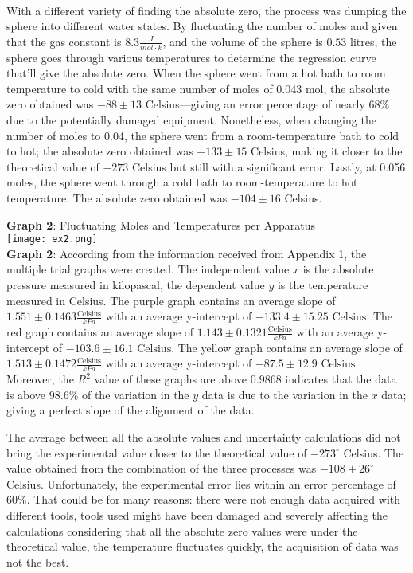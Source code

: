 \documentclass[11pt]{article}
\begin{document}
\\With a different variety of finding the absolute zero, the process was dumping the sphere into different water states. By fluctuating the number of moles and given that the gas constant is $8.3 \frac{J}{mol\cdot k}$, and the volume of the sphere is $0.53$ litres, the sphere goes through various temperatures to determine the regression curve that'll give the absolute zero. When the sphere went from a hot bath to room temperature to cold with the same number of moles of 0.043 mol, the absolute zero obtained was $-88\pm13$ Celsius—giving an error percentage of nearly $68\%$ due to the potentially damaged equipment. Nonetheless, when changing the number of moles to 0.04, the sphere went from a room-temperature bath to cold to hot; the absolute zero obtained was $-133\pm15$ Celsius, making it closer to the theoretical value of $-273$ Celsius but still with a significant error. Lastly, at 0.056 moles, the sphere went through a cold bath to room-temperature to hot temperature. The absolute zero obtained was $-104\pm 16$ Celsius. 
\newpage 
\begin{center}
    \textbf{Graph 2}: Fluctuating Moles and Temperatures per Apparatus\\
    \texttt{[image: ex2.png]}\\\textbf{Graph 2}: According from the information received from Appendix 1, the multiple trial graphs were created. The independent value $x$ is the absolute pressure measured in kilopascal, the dependent value $y$ is the temperature measured in Celsius. The purple graph contains an average slope of $1.551\pm 0.1463 \frac{\text{Celsius}}{kPa}$ with an average y-intercept of $-133.4\pm15.25 \text{ Celsius}$. The red graph contains an average slope of $1.143\pm 0.1321 \frac{\text{Celsius}}{kPa}$ with an average y-intercept of $-103.6\pm16.1 \text{ Celsius}$. The yellow graph contains an average slope of $1.513\pm 0.1472 \frac{\text{Celsius}}{kPa}$ with an average y-intercept of $-87.5\pm12.9 \text{ Celsius}$. Moreover, the $R^2$ value of these graphs are above $0.9868$ indicates that the data is above $98.6\%$ of the variation in the $y$ data is due to the variation in the $x$ data; giving a perfect slope of the alignment of the data. 
\end{center}
The average between all the absolute values and uncertainty calculations did not bring the experimental value closer to the theoretical value of $-273^\circ$ Celsius. The value obtained from the combination of the three processes was $-108\pm26^\circ$ Celsius. Unfortunately, the experimental error lies within an error percentage of $60\%$. That could be for many reasons: there were not enough data acquired with different tools, tools used might have been damaged and severely affecting the calculations considering that all the absolute zero values were under the theoretical value, the temperature fluctuates quickly, the acquisition of data was not the best. 
\end{document}
